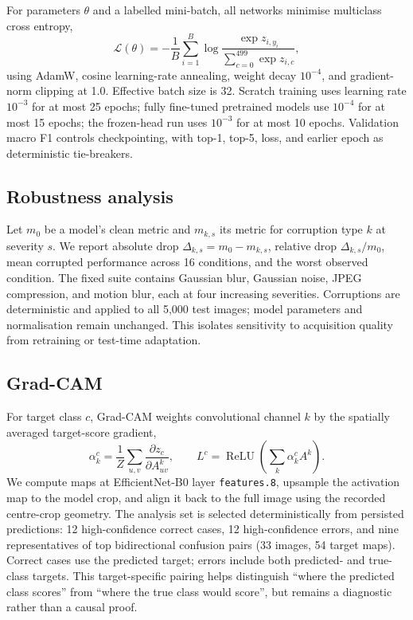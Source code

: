 For parameters $\theta$ and a labelled mini-batch, all networks minimise
multiclass cross entropy,
\begin{equation}
  \mathcal{L}(\theta)=-\frac{1}{B}\sum_{i=1}^{B}
  \log\frac{\exp z_{i,y_i}}{\sum_{c=0}^{499}\exp z_{i,c}},
  \label{eq:crossentropy}
\end{equation}
using AdamW, cosine learning-rate annealing, weight decay $10^{-4}$, and
gradient-norm clipping at 1.0.  Effective batch size is 32.  Scratch training
uses learning rate $10^{-3}$ for at most 25 epochs; fully fine-tuned pretrained
models use $10^{-4}$ for at most 15 epochs; the frozen-head run uses
$10^{-3}$ for at most 10 epochs.  Validation macro F1 controls checkpointing,
with top-1, top-5, loss, and earlier epoch as deterministic tie-breakers.

\subsection{Robustness analysis}

Let $m_0$ be a model's clean metric and $m_{k,s}$ its metric for corruption
type $k$ at severity $s$.  We report absolute drop
$\Delta_{k,s}=m_0-m_{k,s}$, relative drop $\Delta_{k,s}/m_0$, mean corrupted
performance across 16 conditions, and the worst observed condition.
The fixed suite contains Gaussian blur, Gaussian noise, JPEG compression, and
motion blur, each at four increasing severities.  Corruptions are deterministic
and applied to all 5,000 test images; model parameters and normalisation remain
unchanged.  This isolates sensitivity to acquisition quality from retraining
or test-time adaptation.

\subsection{Grad-CAM}

For target class $c$, Grad-CAM weights convolutional channel $k$ by the
spatially averaged target-score gradient,
\begin{equation}
  \alpha_k^c=\frac{1}{Z}\sum_{u,v}
  \frac{\partial z_c}{\partial A_{uv}^{k}}, \qquad
  L^c=\operatorname{ReLU}\!\left(\sum_k\alpha_k^c A^k\right).
  \label{eq:gradcam}
\end{equation}
We compute maps at EfficientNet-B0 layer \texttt{features.8}, upsample the
activation map to the model crop, and align it back to the full image using the
recorded centre-crop geometry.  The analysis set is selected deterministically
from persisted predictions: 12 high-confidence correct cases, 12
high-confidence errors, and nine representatives of top bidirectional
confusion pairs (33 images, 54 target maps).  Correct cases use the predicted
target; errors include both predicted- and true-class targets.  This
target-specific pairing helps distinguish ``where the predicted class scores''
from ``where the true class would score'', but remains a diagnostic rather than
a causal proof.
